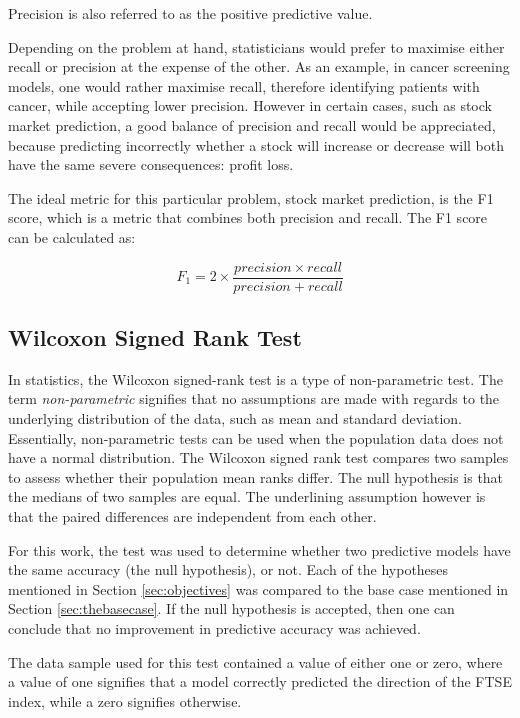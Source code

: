\documentclass{UoYCSproject}
\begin{document}
Precision is also referred to as the positive predictive value.

Depending on the problem at hand, statisticians would prefer to maximise either recall or precision at the expense of the other. As an example, in cancer screening models, one would rather maximise recall, therefore identifying patients with cancer, while accepting lower precision. However in certain cases, such as stock market prediction, a good balance of precision and recall would be appreciated, because predicting incorrectly whether a stock will increase or decrease will both have the same severe consequences: profit loss.

The ideal metric for this particular problem, stock market prediction, is the F1 score, which is a metric that combines both precision and recall. The F1 score can be calculated as:

\begin{equation}
\label{eq:f1}
F_1=2 \times \frac{precision \times recall}{precision + recall}
\end{equation}

\subsection{Wilcoxon Signed Rank Test} 
\label{sec:wilcoxon}
In statistics, the Wilcoxon signed-rank test is a type of non-parametric test. The term \textit{non-parametric} signifies that no assumptions are made with regards to the underlying distribution of the data, such as mean and standard deviation. Essentially, non-parametric tests can be used when the population data does not have a normal distribution. The Wilcoxon signed rank test compares two samples to assess whether their population mean ranks differ. The null hypothesis is that the medians of two samples are equal. The underlining assumption however is that the paired differences are independent from each other.

For this work, the test was used to determine whether two predictive models have the same accuracy (the null hypothesis), or not. Each of the hypotheses mentioned in Section \ref{sec:objectives} was compared to the base case mentioned in Section \ref{sec:thebasecase}. If the null hypothesis is accepted, then one can conclude that no improvement in predictive accuracy was achieved. 

The data sample used for this test contained a value of either one or zero, where a value of one signifies that a model correctly predicted the direction of the FTSE index, while a zero signifies otherwise.
\end{document}
